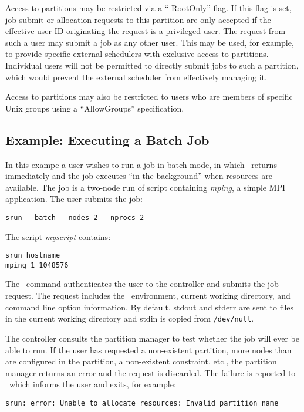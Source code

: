 Access to partitions may be restricted via a `` RootOnly'' flag.  
If this flag is set, job submit or allocation requests to this 
partition are only accepted if the effective user ID originating 
the request is a privileged user. 
The request from such a user may submit a job as any other user. 
This may be used, for example, to provide specific external schedulers
with exclusive access to partitions.  Individual users will not be 
permitted to directly submit jobs to such a partition, which would 
prevent the external scheduler from effectively managing it.  

Access to partitions may also be restricted to users who are 
members of specific Unix groups using a ``AllowGroups'' specification.

\subsection{Example:  Executing a Batch Job}

In this exampe a user wishes to run a job in batch mode, in which \srun\ returns 
immediately and the job executes ``in the background'' when resources
are available.
The job is a two-node run of script containing {\em mping}, a simple MPI application.
The user submits the job:
\begin{verbatim}
srun --batch --nodes 2 --nprocs 2
\end{verbatim}
The script {\em myscript} contains:
\begin{verbatim}
srun hostname
mping 1 1048576
\end{verbatim}

The \srun\ command authenticates the user to the controller and submits
the job request. 
The request includes the \srun\ environment, current working directory, 
and command line option information. By default, stdout and stderr are
sent to files in the current working directory and stdin is copied from
{\tt /dev/null}.

The controller consults the partition manager to test whether the job 
will ever be able to run.  If the user has requested a non-existent partition,
more nodes than are configured in the partition, a non-existent constraint, 
etc., the partition manager returns an error and the request is discarded.
The failure is reported to \srun\ which informs the user and exits, for example:
\begin{verbatim}
srun: error: Unable to allocate resources: Invalid partition name
\end{verbatim}

